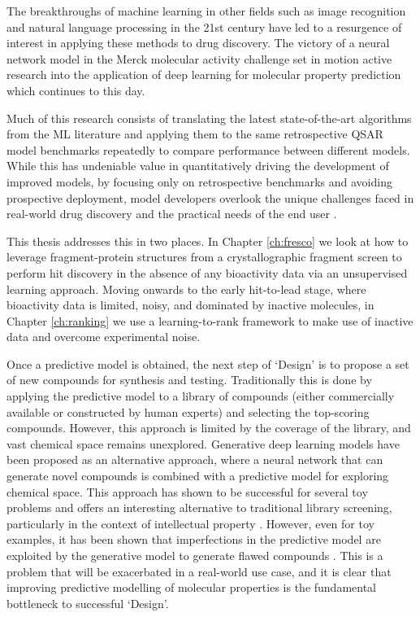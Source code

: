 The breakthroughs of machine learning in other fields such as image recognition and natural language processing in the 21st century have led to a resurgence of interest in applying these methods to drug discovery. The victory of a neural network model in the Merck molecular activity challenge \cite{Ma2015MerckMolecularActivity} set in motion active research into the application of deep learning for molecular property prediction which continues to this day.

Much of this research consists of translating the latest state-of-the-art algorithms from the ML literature and applying them to the same retrospective QSAR model benchmarks repeatedly to compare performance between different models. While this has undeniable value in quantitatively driving the development of improved models, by focusing only on retrospective benchmarks and avoiding prospective deployment, model developers overlook the unique challenges faced in real-world drug discovery and the practical needs of the end user \cite{Kearnes2021Prospective}.

This thesis addresses this in two places. In Chapter \ref{ch:fresco} we look at how to leverage fragment-protein structures from a crystallographic fragment screen to perform hit discovery in the absence of any bioactivity data via an unsupervised learning approach. Moving onwards to the early hit-to-lead stage, where bioactivity data is limited, noisy, and dominated by inactive molecules, in Chapter \ref{ch:ranking} we use a learning-to-rank framework to make use of inactive data and overcome experimental noise.

Once a predictive model is obtained, the next step of `Design' is to propose a set of new compounds for synthesis and testing. Traditionally this is done by applying the predictive model to a library of compounds (either commercially available or constructed by human experts) and selecting the top-scoring compounds. However, this approach is limited by the coverage of the library, and vast chemical space remains unexplored. Generative deep learning models have been proposed as an alternative approach, where a neural network that can generate novel compounds is combined with a predictive model for exploring chemical space. This approach has shown to be successful for several toy problems and offers an interesting alternative to traditional library screening, particularly in the context of intellectual property \cite{Meyers2021DeNovo}. However, even for toy examples, it has been shown that imperfections in the predictive model are exploited by the generative model to generate flawed compounds \cite{Renz2019FailureModes}. This is a problem that will be exacerbated in a real-world use case, and it is clear that improving predictive modelling of molecular properties is the fundamental bottleneck to successful `Design'.

